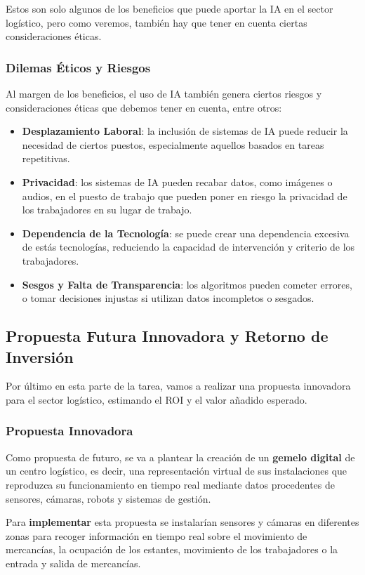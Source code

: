 Estos son solo algunos de los beneficios que puede aportar la IA en el sector logístico, pero como veremos, también hay que tener en cuenta ciertas consideraciones éticas.

\subsubsection{Dilemas Éticos y Riesgos}
Al margen de los beneficios, el uso de IA también genera ciertos riesgos y consideraciones éticas que debemos tener en cuenta, entre otros:

\begin{itemize}
	\item \textbf{Desplazamiento Laboral}: la inclusión de sistemas de IA puede reducir la necesidad de ciertos puestos, especialmente aquellos basados en tareas repetitivas.
	\item \textbf{Privacidad}: los sistemas de IA pueden recabar datos, como imágenes o audios, en el puesto de trabajo que pueden poner en riesgo la privacidad de los trabajadores en su lugar de trabajo.
	\item \textbf{Dependencia de la Tecnología}: se puede crear una dependencia excesiva de estás tecnologías, reduciendo la capacidad de intervención y criterio de los trabajadores.
	\item \textbf{Sesgos y Falta de Transparencia}: los algoritmos pueden cometer errores, o tomar decisiones injustas si utilizan datos incompletos o sesgados.
\end{itemize}

\subsection{Propuesta Futura Innovadora y Retorno de Inversión}
Por último en esta parte de la tarea, vamos a realizar una propuesta innovadora para el sector logístico, estimando el ROI y el valor añadido esperado.

\subsubsection{Propuesta Innovadora}
Como propuesta de futuro, se va a plantear la creación de un \textbf{gemelo digital} de un centro logístico, es decir, una representación virtual de sus instalaciones que reproduzca su funcionamiento en tiempo real mediante datos procedentes de sensores, cámaras, robots y sistemas de gestión.

Para \textbf{implementar} esta propuesta se instalarían sensores y cámaras en diferentes zonas para recoger información en tiempo real sobre el movimiento de mercancías, la ocupación de los estantes, movimiento de los trabajadores o la entrada y salida de mercancías.

